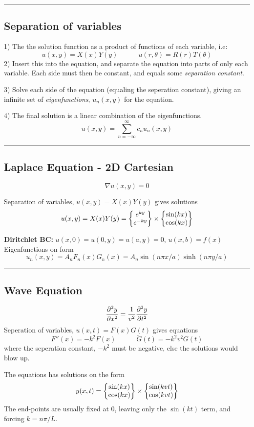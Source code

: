 \documentclass[10pt,a4paper]{article}
\renewcommand{\exp}{e^}
\newcommand{\holine}{\rule{286pt}{1pt}}
\begin{document}
\begin{multicols}{2}
\holine
\subsection*{Separation of variables}
1) The the solution function as a product of functions of each variable, i.e:
\[
    u(x,y) = X(x)Y(y) \quad\quad\quad u(r, \theta) = R(r)T(\theta)
\]
2) Insert this into the equation, and separate the equation into parts of only each variable. Each side must then be constant, and equals some \textit{separation constant}.

3) Solve each side of the equation (equaling the seperation constant), giving an infinite set of \textit{eigenfunctions}, $u_n(x,y)$ for the equation.

4) The final solution is a linear combination of the eigenfunctions.
\[
u(x,y) = \sum_{n=-\infty}^\infty c_n u_n(x,y)
\]



\holine
\subsection*{Laplace Equation - 2D Cartesian}
\[
    \nabla u(x,y) = 0
\]

Separation of variables, $u(x,y) = X(x)Y(y)$ gives solutions
\[
    u(x,y) = X(x)Y(y) = \qty{\begin{matrix} \exp{ky} \\ \exp{-ky} \end{matrix}} \times \qty{\begin{matrix} \sin(kx) \\ \cos(kx) \end{matrix}}
\]

\textbf{Diritchlet BC:} $u(x,0) = u(0,y) = u(a,y) = 0$, $u(x,b) = f(x)$
Eigenfunctions on form
\[
    u_n(x,y) = A_nF_n(x)G_n(x) = A_n\sin(n\pi x/a)\sinh(n\pi y/a)
\]


\holine
\subsection*{Wave Equation}
\[
    \pdv[2]{y}{x} = \frac{1}{v^2}\pdv[2]{y}{t}
\]
Seperation of variables, $u(x,t) = F(x)G(t)$ gives equations
\[
    F''(x) = -k^2F(x) \quad\quad\quad \ddot{G}(t) = -k^2v^2G(t)
\]
where the seperation constant, $-k^2$ must be negative, else the solutions would blow up.

The equations has solutions on the form
\[
    y(x,t) = \qty{\begin{matrix} \sin(kx) \\ \cos(kx) \end{matrix}} \times \qty{\begin{matrix} \sin(kvt) \\ \cos(kvt) \end{matrix}}
\]
The end-points are usually fixed at 0, leaving only the $\sin(kt)$ term, and forcing $k=n\pi/L$.


\end{multicols}
\end{document}
